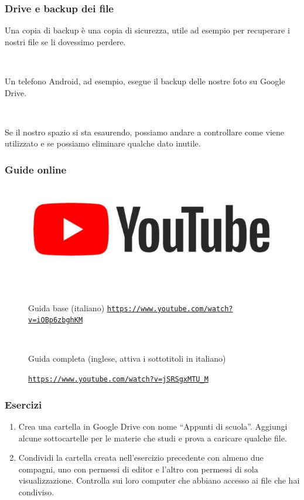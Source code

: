 \documentclass[]{beamer}
\begin{document}
\begin{frame}
\frametitle{Drive e backup dei file}
Una \alert{copia di backup} è una copia di sicurezza, utile ad esempio per recuperare i nostri file se li dovessimo perdere.\pause

~

Un telefono Android, ad esempio, esegue il backup delle nostre foto su Google Drive.\pause

~

Se il nostro spazio si sta esaurendo, possiamo andare a controllare come viene utilizzato e se possiamo eliminare qualche dato inutile.
\end{frame}



\begin{frame}
\frametitle{Guide online}
\begin{figure}
\includegraphics[width=.5\columnwidth]{img/ytlogo.jpg}

~

Guida base (italiano)
\href{https://www.youtube.com/watch?v=iOBp6zbghKM}{\texttt{https://www.youtube.com/watch?v=iOBp6zbghKM}}

~

Guida completa (inglese, attiva i sottotitoli in italiano)

\href{https://www.youtube.com/watch?v=jSRSgxMTU_M}{\texttt{https://www.youtube.com/watch?v=jSRSgxMTU\_M}}
\end{figure}
\end{frame}



\begin{frame}
\frametitle{Esercizi}
\begin{enumerate}
  \item Crea una cartella in Google Drive con nome ``Appunti di scuola''. Aggiungi alcune sottocartelle per le materie che studi e prova a caricare qualche file.
  \item Condividi la cartella creata nell'esercizio precedente con almeno due compagni, uno con permessi di editor e l'altro con permessi di sola visualizzazione. Controlla sui loro computer che abbiano accesso ai file che hai condiviso.
\end{enumerate}
\end{frame}
\end{document}
